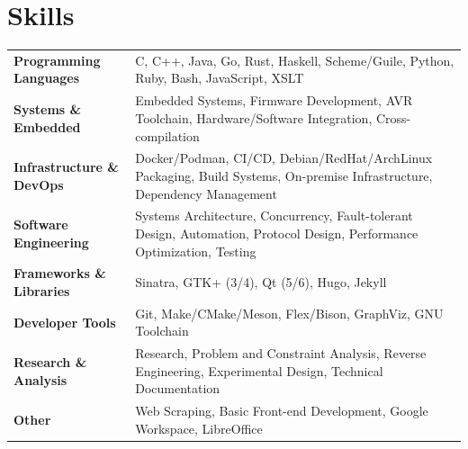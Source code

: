 \section{Skills}
\begin{tabularx}{\linewidth}{@{}l X@{}}

\textbf{Programming Languages}  &  \normalsize{C, C++, Java, Go, Rust, Haskell, Scheme/Guile, Python, Ruby, Bash, JavaScript, XSLT}\\

\textbf{Systems \& Embedded} &
\normalsize{Embedded Systems, Firmware Development, AVR Toolchain, Hardware/Software Integration, Cross-compilation}\\

\textbf{Infrastructure \& DevOps} &
\normalsize{Docker/Podman, CI/CD, Debian/RedHat/ArchLinux Packaging, Build Systems, On-premise Infrastructure, Dependency Management}\\

\textbf{Software Engineering} &
\normalsize{Systems Architecture, Concurrency, Fault-tolerant Design, Automation, Protocol Design, Performance Optimization, Testing}\\

\textbf{Frameworks \& Libraries}  &  \normalsize{Sinatra, GTK+ (3/4), Qt (5/6), Hugo, Jekyll }\\
\textbf{Developer Tools} &
\normalsize{Git, Make/CMake/Meson, Flex/Bison, GraphViz, GNU Toolchain}\\

\textbf{Research \& Analysis} &
\normalsize{Research, Problem and Constraint Analysis, Reverse Engineering, Experimental Design, Technical Documentation}\\

\textbf{Other} &
\normalsize{Web Scraping, Basic Front-end Development, Google Workspace, LibreOffice}\\
\end{tabularx}
